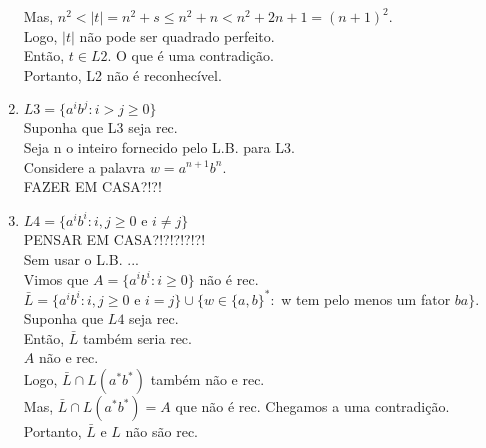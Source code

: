 \documentclass{article}
\begin{document}
\begin{enumerate}
                Mas, $ n^2 < |t| = n^2+s \leq n^2 + n < n^2 + 2n +1 = (n+1)^2$.\\
                Logo, $ |t| $ não pode ser quadrado perfeito.\\
                Então, $ t \in L2 $. O que é uma contradição.\\
                Portanto, L2 não é reconhecível.
        \item $ L3 = \{ a^ib^j : i > j \geq 0 \} $\\
                Suponha que L3 seja rec.\\
                Seja n o inteiro fornecido pelo L.B. para L3.\\
                Considere a palavra $w = a^{n+1}b^n $.\\
                FAZER EM CASA?!?!
        \item $ L4 = \{ a^ib^i : i,j \geq 0$ e $ i \neq j \} $ \\
                PENSAR EM CASA?!?!?!?!?!\\
                Sem usar o L.B. ...\\
                Vimos que $ A = \{ a^ib^i : i \geq 0 \} $ não é rec.\\
                $ \bar{L} = \{ a^ib^i : i,j \geq 0 $ e $ i = j \} \cup \{ w \in \{a,b\}^* : $ w tem pelo menos um fator $ ba \} $.\\
                Suponha que $ L4 $ seja rec.\\
                Então, $ \bar{L} $ também seria rec.\\
                $ A $ não e rec.\\
                Logo, $ \bar{L} \cap L(a^*b^*) $ também não e rec.\\
                Mas, $ \bar{L} \cap L(a^*b^*) = A$ que não é rec. Chegamos a uma contradição.\\
                Portanto, $ \bar{L} $ e $ L $ não são rec.\\
    \end{enumerate}
    
\end{document}
